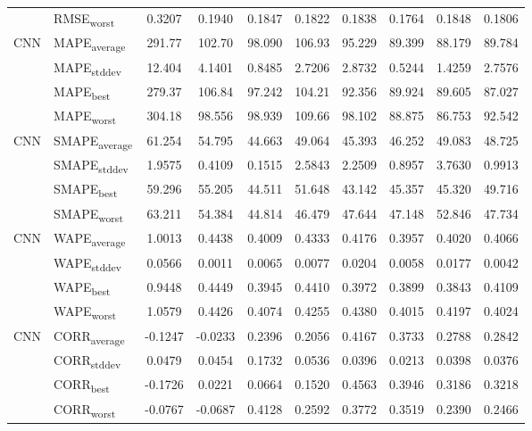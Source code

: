 {\begin{longtable}{l l c c c c c c c c}
 & RMSE\textsubscript{worst} & 0.3207 & 0.1940 & 0.1847 & 0.1822 & 0.1838 & 0.1764 & 0.1848 & 0.1806 \\
\cmidrule(lr){2-10}
\multirow{4}{*}{CNN} & MAPE\textsubscript{average} & 291.77 & 102.70 & 98.090 & 106.93 & 95.229 & 89.399 & 88.179 & 89.784 \\
 & MAPE\textsubscript{stddev} & 12.404 & 4.1401 & 0.8485 & 2.7206 & 2.8732 & 0.5244 & 1.4259 & 2.7576 \\
 & MAPE\textsubscript{best} & 279.37 & 106.84 & 97.242 & 104.21 & 92.356 & 89.924 & 89.605 & 87.027 \\
 & MAPE\textsubscript{worst} & 304.18 & 98.556 & 98.939 & 109.66 & 98.102 & 88.875 & 86.753 & 92.542 \\
\cmidrule(lr){2-10}
\multirow{4}{*}{CNN} & SMAPE\textsubscript{average} & 61.254 & 54.795 & 44.663 & 49.064 & 45.393 & 46.252 & 49.083 & 48.725 \\
 & SMAPE\textsubscript{stddev} & 1.9575 & 0.4109 & 0.1515 & 2.5843 & 2.2509 & 0.8957 & 3.7630 & 0.9913 \\
 & SMAPE\textsubscript{best} & 59.296 & 55.205 & 44.511 & 51.648 & 43.142 & 45.357 & 45.320 & 49.716 \\
 & SMAPE\textsubscript{worst} & 63.211 & 54.384 & 44.814 & 46.479 & 47.644 & 47.148 & 52.846 & 47.734 \\
\cmidrule(lr){2-10}
\multirow{4}{*}{CNN} & WAPE\textsubscript{average} & 1.0013 & 0.4438 & 0.4009 & 0.4333 & 0.4176 & 0.3957 & 0.4020 & 0.4066 \\
 & WAPE\textsubscript{stddev} & 0.0566 & 0.0011 & 0.0065 & 0.0077 & 0.0204 & 0.0058 & 0.0177 & 0.0042 \\
 & WAPE\textsubscript{best} & 0.9448 & 0.4449 & 0.3945 & 0.4410 & 0.3972 & 0.3899 & 0.3843 & 0.4109 \\
 & WAPE\textsubscript{worst} & 1.0579 & 0.4426 & 0.4074 & 0.4255 & 0.4380 & 0.4015 & 0.4197 & 0.4024 \\
\cmidrule(lr){2-10}
\multirow{4}{*}{CNN} & CORR\textsubscript{average} & -0.1247 & -0.0233 & 0.2396 & 0.2056 & 0.4167 & 0.3733 & 0.2788 & 0.2842 \\
 & CORR\textsubscript{stddev} & 0.0479 & 0.0454 & 0.1732 & 0.0536 & 0.0396 & 0.0213 & 0.0398 & 0.0376 \\
 & CORR\textsubscript{best} & -0.1726 & 0.0221 & 0.0664 & 0.1520 & 0.4563 & 0.3946 & 0.3186 & 0.3218 \\
 & CORR\textsubscript{worst} & -0.0767 & -0.0687 & 0.4128 & 0.2592 & 0.3772 & 0.3519 & 0.2390 & 0.2466 \\

\end{longtable}}
